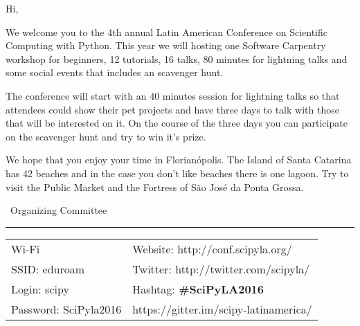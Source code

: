 Hi,

We welcome you to the 4th annual Latin American Conference on Scientific Computing with Python.
This year we will hosting one Software Carpentry workshop for beginners,
12 tutorials, 16 talks, 80 minutes for lightning talks
and some social events that includes an scavenger hunt.

The conference will start with an 40 minutes session for lightning talks
so that attendees could show their pet projects and have three days to talk with
those that will be interested on it.
On the course of the three days you can participate on the scavenger hunt
and try to win it's prize.

We hope that you enjoy your time in Florianópolis.
The Island of Santa Catarina has 42 beaches
and in the case you don't like beaches there is one lagoon.
Try to visit the Public Market
and the Fortress of São José da Ponta Grossa.

\textemdash\ Organizing Committee

\vfill

\hrule

\begin{center}
       \begin{tabular}{p{4cm} p{7cm}}
     Wi-Fi & Website: http://conf.scipyla.org/ \\
     SSID: eduroam & Twitter: http://twitter.com/scipyla/ \\
     Login: scipy & Hashtag: \textbf{\#SciPyLA2016} \\
     Password: SciPyla2016 & https://gitter.im/scipy-latinamerica/
   \end{tabular}
\end{center}

